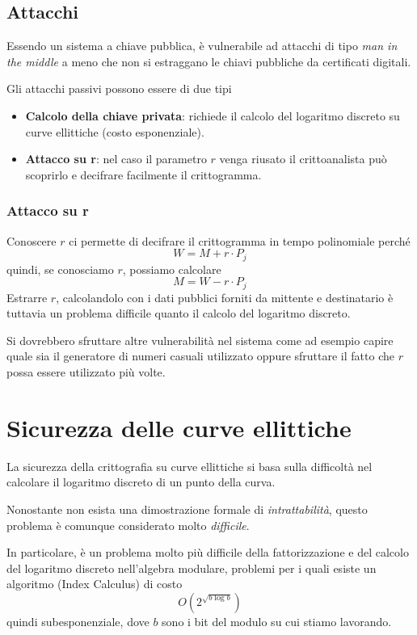 \subsection{Attacchi}
Essendo un sistema a chiave pubblica, \`e vulnerabile ad attacchi di tipo \emph{man in the middle} a meno che non
si estraggano le chiavi pubbliche da certificati digitali.

Gli attacchi passivi possono essere di due tipi
\begin{itemize}
	\item \textbf{Calcolo della chiave privata}: richiede il calcolo del logaritmo discreto su curve ellittiche
	      (costo esponenziale).
	\item \textbf{Attacco su r}: nel caso il parametro $r$ venga riusato il crittoanalista pu\`o scoprirlo e
	      decifrare facilmente il crittogramma.
\end{itemize}

\subsubsection{Attacco su r}
Conoscere $r$ ci permette di decifrare il crittogramma in tempo polinomiale perch\'e
\[ W = M + r \cdot P_j \]
quindi, se conosciamo $r$, possiamo calcolare
\[ M = W - r \cdot P_j \]
Estrarre $r$, calcolandolo con i dati pubblici forniti da mittente e destinatario \`e tuttavia un problema difficile
quanto il calcolo del logaritmo discreto.

Si dovrebbero sfruttare altre vulnerabilit\`a nel sistema come ad esempio capire quale sia il generatore di numeri
casuali utilizzato oppure sfruttare il fatto che $r$ possa essere utilizzato pi\`u volte.

\section{Sicurezza delle curve ellittiche}
La sicurezza della crittografia su curve ellittiche si basa sulla difficolt\`a nel calcolare il logaritmo discreto
di un punto della curva.

Nonostante non esista una dimostrazione formale di \emph{intrattabilit\`a}, questo problema \`e comunque considerato
molto \emph{difficile}.

In particolare, \`e un problema molto pi\`u difficile della fattorizzazione e del calcolo del logaritmo discreto
nell'algebra modulare, problemi per i quali esiste un algoritmo (Index Calculus) di costo
\[ O(2^{\sqrt{b \log b}}) \]
quindi subesponenziale, dove $b$ sono i bit del modulo su cui stiamo lavorando.

